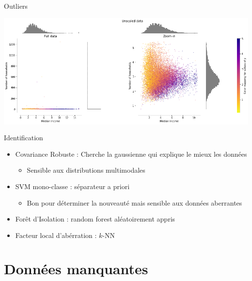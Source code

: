 \documentclass[french]{beamer}
\begin{document}
\begin{frame}{Outliers}
	\begin{center}\includegraphics[width=\textwidth]{outliers.png}\end{center}
\end{frame}

\begin{frame}{Identification}
	\begin{itemize}
		\item Covariance Robuste : Cherche la gaussienne qui explique le mieux les données 
		\begin{itemize}
			\item Sensible aux distributions multimodales
		\end{itemize}
		
		\item SVM mono-classe : séparateur a priori
		\begin{itemize}
			\item Bon pour déterminer la nouveauté mais sensible aux données aberrantes
		\end{itemize}		
		\item Forêt d'Isolation : random forest aléatoirement appris 
		\item Facteur local d'abérration : $k$-NN
	\end{itemize}
\end{frame}

\section[Imputation]{Données manquantes}
\end{document}
